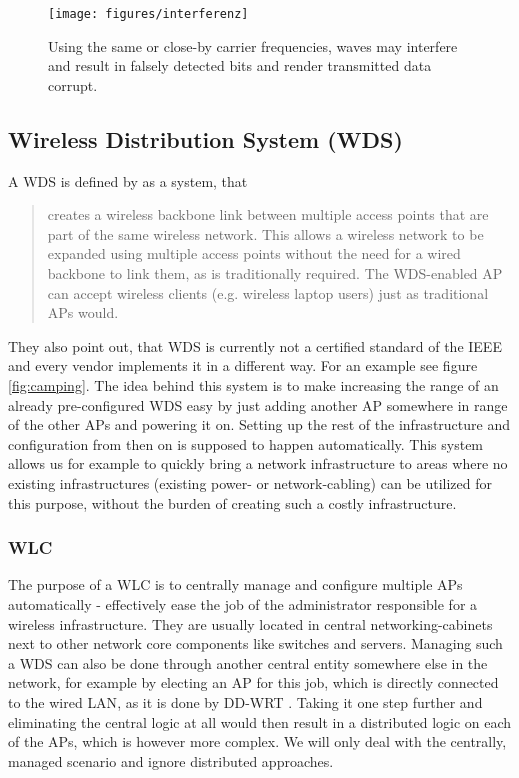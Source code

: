 	\begin{figure}[h!]
	  \centering
	  \texttt{[image: figures/interferenz]}
	  \caption{Using the same or close-by carrier frequencies, waves may interfere and result in falsely detected bits and render transmitted data corrupt.}
	  \label{fig:interferenz}
	\end{figure}
	
\newpage
	      
    \subsection{Wireless Distribution System (WDS)}
      A \ac{WDS} is defined by \cite{dd_wrt} as a system, that
      
      \begin{quote}
	creates a wireless backbone link between multiple access points that are part of the same wireless network. 
	This allows a wireless network to be expanded using multiple access points without the need for a wired backbone to link them, as is traditionally required. 
	The WDS-enabled \ac{AP} can accept wireless clients (e.g. wireless laptop users) just as traditional APs would.
      \end{quote}

      They also point out, that WDS is currently not a certified standard of the \ac{IEEE} and every vendor implements it in a different way.
      For an example see figure \ref{fig:camping}. The idea behind this system is to make increasing the range of an already pre-configured \ac{WDS}
      easy by just adding another \ac{AP} somewhere in range of the other APs and powering it on.
      Setting up the rest of the infrastructure and configuration from then on is supposed to happen automatically. 
      This system allows us for example to quickly bring a network infrastructure to areas where no 
      existing infrastructures (existing power- or network-cabling) can be utilized for this purpose, without the burden of creating such a costly infrastructure.
      
      \subsubsection{\ac{WLC}}
	The purpose of a \ac{WLC} is to centrally manage and configure multiple APs automatically - effectively ease the job of the administrator responsible for a 
	wireless infrastructure. They are usually located in central networking-cabinets next to other network core components like switches and servers.
	Managing such a \ac{WDS} can also be done through another central entity somewhere else in the network, for example by
	electing an \ac{AP} for this job, which is directly connected to the wired \ac{LAN}, as it is done by DD-WRT \cite{dd_wrt}. 
	Taking it one step further and eliminating the central logic at all would then result in a distributed logic on each of the APs, which is however more complex. 
	We will only deal with the centrally, managed scenario and ignore distributed approaches.
	
